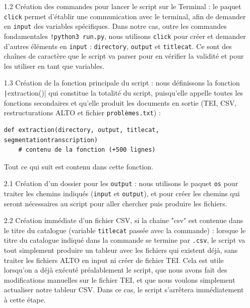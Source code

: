 \documentclass[a4paper,12pt,twoside]{book}
\begin{document}
\begin{itemize}
\item [1.2] Création des commandes pour lancer le script sur le Terminal : le paquet \texttt{click} permet d'établir une communication avec le terminal, afin de demander en \texttt{input} des variables spécifiques. Dans notre cas, outre les commandes fondamentales \texttt{!python3 run.py}, nous utilisons \texttt{click} pour créer et demander d'autres éléments en \texttt{input} : \texttt{directory}, \texttt{output} et \texttt{titlecat}. Ce sont des chaînes de caractère que le script va parser pour en vérifier la validité et pour les utiliser en tant que variables.

\item [1.3] Création de la fonction principale du script : nous définissons la fonction \texttt|extraction()| qui constitue la totalité du script, puisqu'elle appelle toutes les fonctions secondaires et qu'elle produit les documents en sortie (TEI, CSV, restructurations ALTO et fichier \texttt{problèmes.txt}) :


\begin{normalsize}
	\begin{verbatim}
def extraction(directory, output, titlecat, segmentationtranscription)
	# contenu de la fonction (+500 lignes)
	\end{verbatim}
\end{normalsize}

Tout ce qui suit est contenu dans cette fonction.\\

\item [2.1] Création d'un dossier pour les \texttt{output} : nous utilisons le paquet \texttt{os} pour traiter les chemins indiqués (\texttt{input} et \texttt{output}), et pour créer les chemins qui seront nécessaires au script pour aller chercher puis produire les fichiers.

\item [2.2] Création immédiate d'un fichier CSV, si la chaine "csv" est contenue dans le titre du catalogue (variable \texttt{titlecat} passée avec la commande) : lorsque le titre du catalogue indiqué dans la commande se termine par \texttt{.csv}, le script va tout simplement produire un tableur avec les fichiers qui existent déjà, sans traiter les fichiers ALTO en input ni créer de fichier TEI. Cela est utile lorsqu'on a déjà exécuté préalablement le script, que nous avons fait des modifications manuelles sur le fichier TEI, et que nous voulons simplement actualiser notre tableur CSV. Dans ce cas, le script s'arrêtera immédiatement à cette étape.


\end{itemize}
\end{document}
